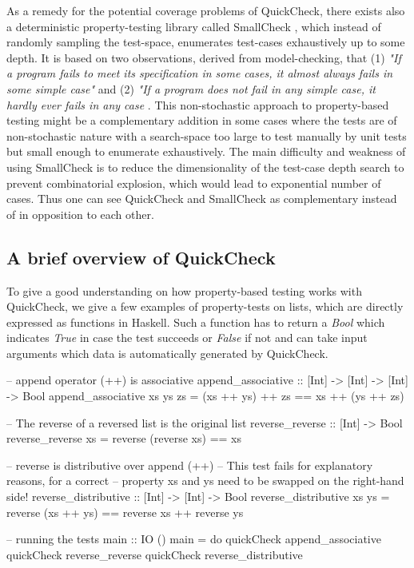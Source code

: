 \medskip

As a remedy for the potential coverage problems of QuickCheck, there exists also a deterministic property-testing library called SmallCheck \cite{runciman_smallcheck_2008}, which instead of randomly sampling the test-space, enumerates test-cases exhaustively up to some depth. It is based on two observations, derived from model-checking, that (1) \textit{"If a program fails to meet its specification in some cases, it almost always fails in some simple case"} and (2) \textit{"If a program does not fail in any simple case, it hardly ever fails in any case} \cite{runciman_smallcheck_2008}. This non-stochastic approach to property-based testing might be a complementary addition in some cases where the tests are of non-stochastic nature with a search-space  too large to test manually by unit tests but small enough to enumerate exhaustively. The main difficulty and weakness of using SmallCheck is to reduce the dimensionality of the test-case depth search to prevent combinatorial explosion, which would lead to exponential number of cases. Thus one can see QuickCheck and SmallCheck as complementary instead of in opposition to each other.

\subsection*{A brief overview of QuickCheck}
To give a good understanding on how property-based testing works with QuickCheck, we give a few examples of property-tests on lists, which are directly expressed as functions in Haskell. Such a function has to return a \textit{Bool} which indicates \textit{True} in case the test succeeds or \textit{False} if not and can take input arguments which data is automatically generated by QuickCheck.

\begin{HaskellCode}
-- append operator (++) is associative
append_associative :: [Int] -> [Int] -> [Int] -> Bool
append_associative xs ys zs = (xs ++ ys) ++ zs == xs ++ (ys ++ zs)

-- The reverse of a reversed list is the original list
reverse_reverse :: [Int] -> Bool
reverse_reverse xs = reverse (reverse xs) == xs

-- reverse is distributive over append (++)
-- This test fails for explanatory reasons, for a correct 
-- property xs and ys need to be swapped on the right-hand side!
reverse_distributive :: [Int] -> [Int] -> Bool
reverse_distributive xs ys = reverse (xs ++ ys) == reverse xs ++ reverse ys

-- running the tests
main :: IO ()
main = do
  quickCheck append_associative
  quickCheck reverse_reverse
  quickCheck reverse_distributive
\end{HaskellCode}

